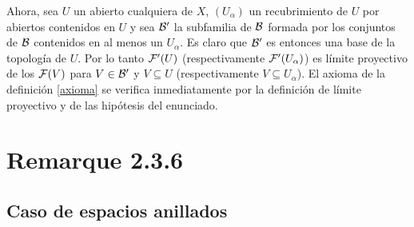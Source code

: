 \documentclass[twoside]{article}
\begin{document}
\begin{dem}
Ahora, sea $U$ un abierto cualquiera de $X$, $(U_\alpha)$ un recubrimiento de $U$ por abiertos contenidos en $U$ y sea ${\mathcal B}'$ la subfamilia de ${\mathcal B}$ formada por los conjuntos de ${\mathcal B}$ contenidos en al menos un $U_\alpha$. Es claro que ${\mathcal B}'$ es entonces una base de la topología de $U$. Por lo tanto $\mathcal{F}'(U)$ (respectivamente $\mathcal{F}'(U_\alpha)$) es límite proyectivo de los $\mathcal{F}(V)$ para $V\in{\mathcal B}'$ y $V\subseteq U$ (respectivamente $V\subseteq U_\alpha$). El axioma de la definición \ref{axioma} se verifica inmediatamente por la definición de límite proyectivo y de las hipótesis del enunciado. 

 \end{dem}
 
 




\section{Remarque 2.3.6}


 \subsection{Caso de espacios anillados}
\end{document}
